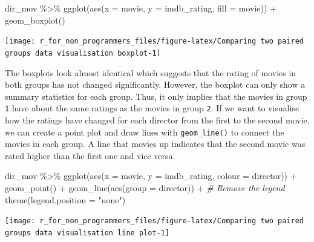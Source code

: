 \documentclass[
]{book}
\newenvironment{Shaded}{\begin{snugshade}}{\end{snugshade}}
\newcommand{\AttributeTok}[1]{\textcolor[rgb]{0.77,0.63,0.00}{#1}}
\newcommand{\CommentTok}[1]{\textcolor[rgb]{0.56,0.35,0.01}{\textit{#1}}}
\newcommand{\FunctionTok}[1]{\textcolor[rgb]{0.00,0.00,0.00}{#1}}
\newcommand{\NormalTok}[1]{#1}
\newcommand{\SpecialCharTok}[1]{\textcolor[rgb]{0.00,0.00,0.00}{#1}}
\newcommand{\StringTok}[1]{\textcolor[rgb]{0.31,0.60,0.02}{#1}}
\begin{document}
\begin{Shaded}
\begin{Highlighting}[]
\NormalTok{dir\_mov }\SpecialCharTok{\%\textgreater{}\%} 
  \FunctionTok{ggplot}\NormalTok{(}\FunctionTok{aes}\NormalTok{(}\AttributeTok{x =}\NormalTok{ movie, }\AttributeTok{y =}\NormalTok{ imdb\_rating, }\AttributeTok{fill =}\NormalTok{ movie)) }\SpecialCharTok{+}
  \FunctionTok{geom\_boxplot}\NormalTok{()}
\end{Highlighting}
\end{Shaded}

\begin{center}\texttt{[image: r\_for\_non\_programmers\_files/figure-latex/Comparing two paired groups data visualisation boxplot-1]} \end{center}

The boxplots look almost identical which suggests that the rating of movies in both groups has not changed significantly. However, the boxplot can only show a summary statistics for each group. Thus, it only implies that the movies in group \texttt{1} have about the same ratings as the movies in group \texttt{2}. If we want to visualise how the ratings have changed for each director from the first to the second movie, we can create a point plot and draw lines with \texttt{geom\_line()} to connect the movies in each group. A line that movies up indicates that the second movie was rated higher than the first one and vice versa.

\begin{Shaded}
\begin{Highlighting}[]
\NormalTok{dir\_mov }\SpecialCharTok{\%\textgreater{}\%}
  \FunctionTok{ggplot}\NormalTok{(}\FunctionTok{aes}\NormalTok{(}\AttributeTok{x =}\NormalTok{ movie, }\AttributeTok{y =}\NormalTok{ imdb\_rating, }\AttributeTok{colour =}\NormalTok{ director)) }\SpecialCharTok{+}
  \FunctionTok{geom\_point}\NormalTok{() }\SpecialCharTok{+}
  \FunctionTok{geom\_line}\NormalTok{(}\FunctionTok{aes}\NormalTok{(}\AttributeTok{group =}\NormalTok{ director)) }\SpecialCharTok{+}
  \CommentTok{\# Remove the legend}
  \FunctionTok{theme}\NormalTok{(}\AttributeTok{legend.position =} \StringTok{"none"}\NormalTok{)}
\end{Highlighting}
\end{Shaded}

\begin{center}\texttt{[image: r\_for\_non\_programmers\_files/figure-latex/Comparing two paired groups data visualisation line plot-1]} \end{center}
\end{document}
